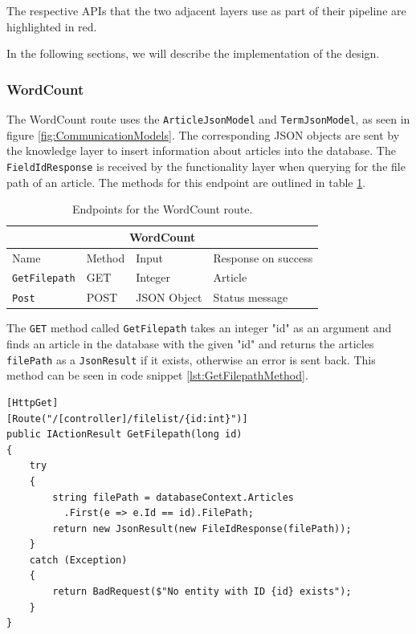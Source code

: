 The respective APIs that the two adjacent layers use as part of their pipeline are highlighted in red. 

In the following sections, we will describe the implementation of the design.

\subsubsection{WordCount}

The WordCount route uses the \texttt{ArticleJsonModel} and \texttt{TermJsonModel}, as seen in figure \ref{fig:CommunicationModels}. The corresponding JSON objects are sent by the knowledge layer to insert information about articles into the database. The \texttt{FieldIdResponse} is received by the functionality layer when querying for the file path of an article. The methods for this endpoint are outlined in table \ref{fig:WordCountEndpoint}.

\begin{table}[h]
  \centering
    \begin{tabular}{|llll|}
    \hline
    \multicolumn{4}{|c|}{\textbf{WordCount}}                                                                                 \\ \hline
    \multicolumn{1}{|l|}{Name}                 & \multicolumn{1}{l|}{Method} & \multicolumn{1}{l|}{Input}       & Response on success       \\ \hline
    \multicolumn{1}{|l|}{\texttt{GetFilepath}} & \multicolumn{1}{l|}{GET}    & \multicolumn{1}{l|}{Integer}     & Article        \\ \hline
    \multicolumn{1}{|l|}{\texttt{Post}}        & \multicolumn{1}{l|}{POST}   & \multicolumn{1}{l|}{JSON Object} & Status message \\ \hline
    \end{tabular}
  \caption{Endpoints for the WordCount route.\label{fig:WordCountEndpoint}}
\end{table}

The \texttt{GET} method called \texttt{GetFilepath} takes an integer "id" as an argument and finds an article in the database with the given "id" and returns the articles \texttt{filePath} as a \texttt{JsonResult} if it exists, otherwise an error is sent back.
This method can be seen in code snippet \ref{lst:GetFilepathMethod}.

\begin{lstlisting}[language=CSharp, caption={The \texttt{GetFilepath} method.}, label={lst:GetFilepathMethod}]
[HttpGet]
[Route("/[controller]/filelist/{id:int}")]
public IActionResult GetFilepath(long id)
{
    try
    {
        string filePath = databaseContext.Articles
          .First(e => e.Id == id).FilePath;
        return new JsonResult(new FileIdResponse(filePath));
    }
    catch (Exception)
    {
        return BadRequest($"No entity with ID {id} exists");
    }
}
\end{lstlisting}

